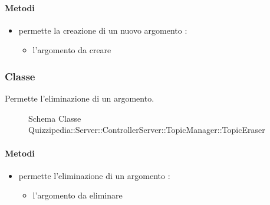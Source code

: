 \paragraph{Metodi}
\begin{itemize}
\item {}
\newline
permette la creazione di un nuovo argomento
\newline
{} :
\begin{itemize}
\item {}
\newline
l'argomento da creare
\end{itemize}
\end{itemize}
\subsubsection{Classe }
Permette l'eliminazione di un argomento.
\begin{figure}[H]
\centering
\noindent{}
\caption[Schema Classe TopicEraser]{Schema Classe Quizzipedia::Server::ControllerServer::TopicManager::TopicEraser}
\end{figure}
\paragraph{Metodi}
\begin{itemize}
\item {}
\newline
permette l'eliminazione di un argomento
\newline
{} :
\begin{itemize}
\item {}
\newline
l'argomento da eliminare
\end{itemize}
\end{itemize}
